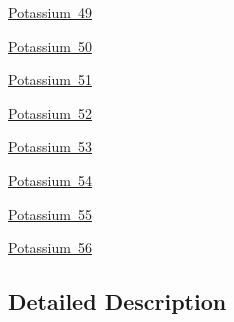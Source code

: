 \begin{DoxyCompactItemize}
\mbox{\hyperlink{group___isotope_const-_potassium-_k49}{Potassium 49}}
\item 
\mbox{\hyperlink{group___isotope_const-_potassium-_k50}{Potassium 50}}
\item 
\mbox{\hyperlink{group___isotope_const-_potassium-_k51}{Potassium 51}}
\item 
\mbox{\hyperlink{group___isotope_const-_potassium-_k52}{Potassium 52}}
\item 
\mbox{\hyperlink{group___isotope_const-_potassium-_k53}{Potassium 53}}
\item 
\mbox{\hyperlink{group___isotope_const-_potassium-_k54}{Potassium 54}}
\item 
\mbox{\hyperlink{group___isotope_const-_potassium-_k55}{Potassium 55}}
\item 
\mbox{\hyperlink{group___isotope_const-_potassium-_k56}{Potassium 56}}
\end{DoxyCompactItemize}


\subsection{Detailed Description}
